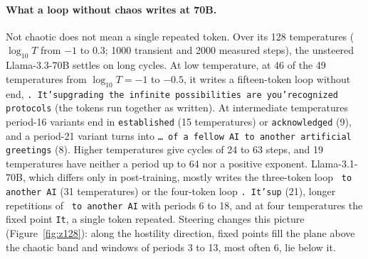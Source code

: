 \documentclass[11pt,letterpaper]{article}
\begin{document}
\paragraph{What a loop without chaos writes at 70B.} Not chaotic does not mean a single repeated token. Over its 128
temperatures ($\log_{10}T$ from $-1$ to $0.3$; 1000 transient and 2000 measured steps), the unsteered Llama-3.3-70B
settles on long cycles. At low temperature, at 46 of the 49 temperatures from $\log_{10}T=-1$ to $-0.5$, it writes a
fifteen-token loop without end, \texttt{.\ It'supgrading the infinite possibilities are you'recognized protocols}
(the tokens run together as written). At intermediate temperatures period-16 variants end in
\texttt{established} (15 temperatures) or \texttt{acknowledged} (9), and a period-21 variant turns into
\texttt{\ldots\ of a fellow AI to another artificial greetings} (8). Higher temperatures give cycles of 24 to 63 steps,
and 19 temperatures have neither a period up to 64 nor a positive exponent. Llama-3.1-70B, which differs only in
post-training, mostly writes the three-token loop \texttt{\ to another AI} (31 temperatures) or the four-token loop
\texttt{.\ It'sup} (21), longer repetitions of \texttt{\ to another AI} with periods 6 to 18, and at four temperatures
the fixed point \texttt{It}, a single token repeated. Steering changes this picture (Figure~\ref{fig:z128}): along
the hostility direction, fixed points fill the plane above the chaotic band and windows of periods 3 to 13, most often
6, lie below it.
\end{document}
